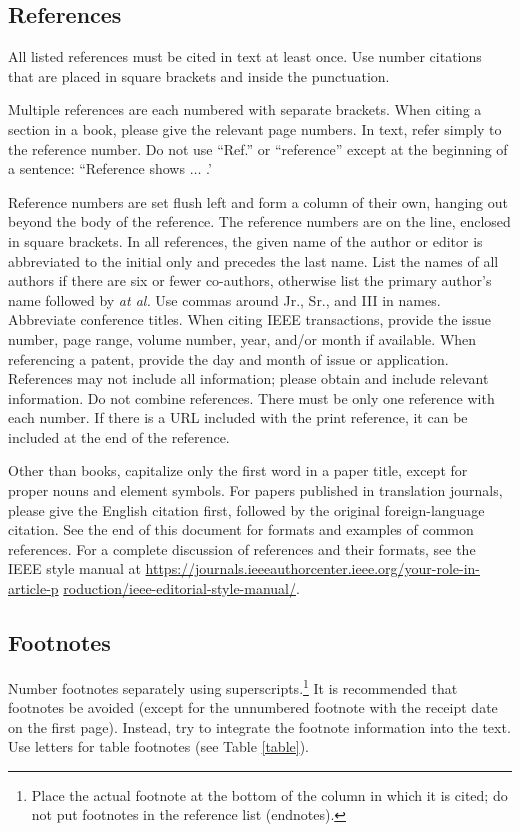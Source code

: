 \documentclass[journal,twoside,web]{ieeecolor}
\begin{document}
\subsection{References}
All listed references must be cited in text at least once. Use number citations
that are placed in square brackets and inside the punctuation.

Multiple references are each numbered with separate brackets.
When citing a section in a book, please give the relevant page numbers.
In text, refer simply to the reference number. Do not use ``Ref.'' or
``reference'' except at the beginning of a sentence:
``Reference \cite{b3} shows $\ldots$ .'

Reference numbers are set flush left and form a column of their own, hanging
out beyond the body of the reference. The reference numbers are on the line,
enclosed in square brackets. In all references, the given name of the author
or editor is abbreviated to the initial only and precedes the last name.
List the names of all authors if there are six or fewer co-authors,
otherwise list the primary author's name followed by \emph{at al.}
Use commas around Jr., Sr., and III in names. Abbreviate conference titles.
When citing IEEE transactions, provide the issue number, page range, volume number,
year, and/or month if available. When referencing a patent, provide the day and
month of issue or application. References may not include all information;
please obtain and include relevant information. Do not combine references.
There must be only one reference with each number. If there is a
URL included with the print reference, it can be included at the end of the reference.

Other than books, capitalize only the first word in a paper title, except
for proper nouns and element symbols. For papers published in translation
journals, please give the English citation first, followed by the original
foreign-language citation. See the end of this document for formats and
examples of common references. For a complete discussion of references and
their formats, see the IEEE style manual at
\underline{https://journals.ieeeauthorcenter.ieee.org/your-role-in-article-p}
\discretionary{}{}{}\underline{roduction/ieee-editorial-style-manual/}.

\subsection{Footnotes}
Number footnotes separately using superscripts.\footnote{Place the actual
    footnote at the bottom of the column in which it is cited; do not put
    footnotes in the reference list (endnotes).}
It is recommended that footnotes be avoided (except for
the unnumbered footnote with the receipt date on the first page).
Instead, try to integrate the footnote information into the text.
Use letters for table footnotes (see Table \ref{table}).
\end{document}
